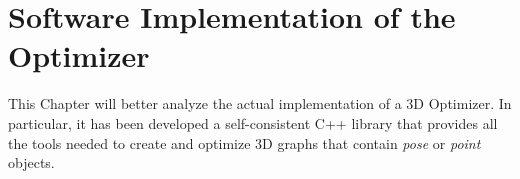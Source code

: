 \chapter{Software Implementation of the Optimizer}\label{ch:implementation}
This Chapter will better analyze the actual implementation of a 3D Optimizer. In particular, it has been developed a self-consistent C++ library that provides all the tools needed to create and optimize 3D graphs that contain \textit{pose} or \textit{point} objects.
